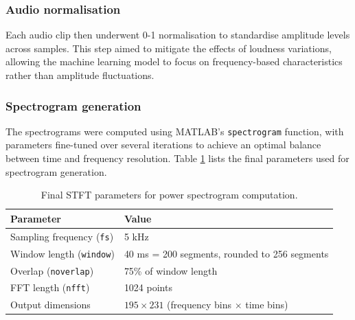 \subsubsection{Audio normalisation}

Each audio clip then underwent 0-1 normalisation to standardise amplitude levels across samples. This step aimed to mitigate the effects of loudness variations, allowing the machine learning model to focus on frequency-based characteristics rather than amplitude fluctuations.

\subsubsection{Spectrogram generation}

The spectrograms were computed using MATLAB's \texttt{spectrogram} function, with parameters fine-tuned over several iterations to achieve an optimal balance between time and frequency resolution. Table \ref{tab:powerspectrogram-parameters} lists the final parameters used for spectrogram generation.

\begin{table}[htbp]
    \centering
    \begin{tabular}{ll} \toprule 
    \textbf{Parameter} & \textbf{Value} \\ \midrule 
    Sampling frequency (\texttt{fs}) & 5 kHz \\ 
    Window length (\texttt{window}) & 40 ms = 200 segments, rounded to 256 segments \\ 
    Overlap (\texttt{noverlap}) & 75\% of window length \\ 
    FFT length (\texttt{nfft}) & 1024 points \\ 
    Output dimensions & $195 \times 231$ (frequency bins $\times$ time bins) \\ \bottomrule
    \end{tabular}
    \caption{Final STFT parameters for power spectrogram computation.}
    \label{tab:powerspectrogram-parameters}
\end{table}

